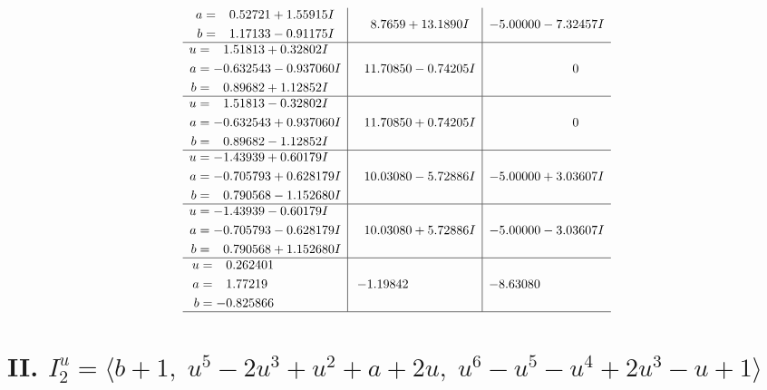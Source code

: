 \documentclass[1p]{elsarticle_modified}
\theoremstyle{definition}
\begin{document}
$$\begin{array}{c|c|c}
\begin{aligned}
a &= \phantom{-}0.52721 + 1.55915 I \\
b &= \phantom{-}1.17133 - 0.91175 I\end{aligned}
 & \phantom{-}8.7659 + 13.1890 I & -5.00000 - 7.32457 I \\ \hline\begin{aligned}
u &= \phantom{-}1.51813 + 0.32802 I \\
a &= -0.632543 - 0.937060 I \\
b &= \phantom{-}0.89682 + 1.12852 I\end{aligned}
 & \phantom{-}11.70850 - 0.74205 I & \phantom{-0.000000 } 0 \\ \hline\begin{aligned}
u &= \phantom{-}1.51813 - 0.32802 I \\
a &= -0.632543 + 0.937060 I \\
b &= \phantom{-}0.89682 - 1.12852 I\end{aligned}
 & \phantom{-}11.70850 + 0.74205 I & \phantom{-0.000000 } 0 \\ \hline\begin{aligned}
u &= -1.43939 + 0.60179 I \\
a &= -0.705793 + 0.628179 I \\
b &= \phantom{-}0.790568 - 1.152680 I\end{aligned}
 & \phantom{-}10.03080 - 5.72886 I & -5.00000 + 3.03607 I \\ \hline\begin{aligned}
u &= -1.43939 - 0.60179 I \\
a &= -0.705793 - 0.628179 I \\
b &= \phantom{-}0.790568 + 1.152680 I\end{aligned}
 & \phantom{-}10.03080 + 5.72886 I & -5.00000 - 3.03607 I \\ \hline\begin{aligned}
u &= \phantom{-}0.262401\phantom{ +0.000000I} \\
a &= \phantom{-}1.77219\phantom{ +0.000000I} \\
b &= -0.825866\phantom{ +0.000000I}\end{aligned}
 & -1.19842\phantom{ +0.000000I} & -8.63080\phantom{ +0.000000I}\\
 \hline 
 \end{array}$$\newpage\newpage\renewcommand{\arraystretch}{1}
\centering \section*{II. $I^u_{2}= \langle b+1,\;u^5-2 u^3+u^2+a+2 u,\;u^6- u^5- u^4+2 u^3- u+1 \rangle$}
\end{document}
